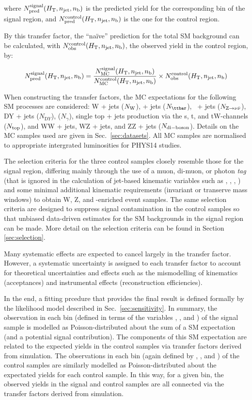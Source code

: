 where $\npre^{\rm signal}(\scalht,\njet,\nb)$ is the predicted yield for the corresponding bin of the signal region, and $\npre^{\rm control}(\scalht,\njet,\nb)$ is the one for the control region.

By this transfer factor, the ``na\"ive'' prediction for the total SM background can be calculated, with $\nobs^{\rm control}(\scalht,\njet,\nb)$, the observed yield in the control region, by:

\begin{equation}
  \label{equ:pred-method}
  \npre^{\rm signal}(\scalht,\njet,\nb) = \frac{N_{\rm MC}^{\rm
      signal}(\scalht,\njet,\nb)}{N_{\rm MC}^{\rm
      control}(\scalht,\njet,\nb)} \times \nobs^{\rm
    control}(\scalht,\njet,\nb)   
\end{equation}

When constructing the transfer factors, the MC expectations for the following SM processes are considered: W + jets ($N_{\rm W}$), \ttbar + jets ($N_{\ttbar}$), \znunu\ + jets ($N_{\znunu}$), DY + jets ($N_{\mathrm DY}$), \gj ($N_\gamma$), single top + jets production via the s, t, and tW-channels ($N_{\rm top}$), and WW + jets, WZ + jets, and ZZ + jets ($N_{\rm di-boson}$). Details on the MC samples used are given in Sec.~\ref{sec:datasets}. All MC samples are normalised to appropriate intergrated luminosities for PHYS14 studies.

The selection criteria for the three control samples closely resemble those for the signal region, differing mainly through the use of a muon, di-muon, or photon {\it tag} (that is ignored in the calculation of jet-based kinematic variables such as \scalht, \mht, \alphat, \etc) and some minimal additional kinematic requirements (\eg invariant or transerve mass windows) to obtain W, Z, and \ttbar-enriched event samples. The same selection criteria are designed to suppress signal contamination in the control samples so that unbiased data-driven estimates for the SM backgrounds in the signal region can be made. More detail on the selection criteria can be found in Section \ref{sec:selection}.

Many systematic effects are expected to cancel largely in the transfer factor. However, a systematic uncertainty is assigned to each transfer factor to account for theoretical uncertainties and effects such as the mismodelling of kinematics (\eg acceptances) and instrumental effects (\eg reconstruction efficiencies).

In the end, a fitting prcedure that provides the final result is defined formally by the likelihood model described in Sec.~\ref{sec:sensitivity}. In summary, the observation in each bin (defined in terms of the variables \njet, \nb, and \scalht) of the signal sample is modelled as Poisson-distributed about the sum of a SM expectation (and a potential signal contribution). The components of this SM expectation are related to the expected yields in the control samples via transfer factors derived from simulation. The observations in each bin (again defined by \njet, \nb, and \scalht) of the control samples are similarly modelled as Poisson-distributed about the expectated yields for each control sample. In this way, for a given bin, the observed yields in the signal and control samples are all connected via the transfer factors derived from simulation.
